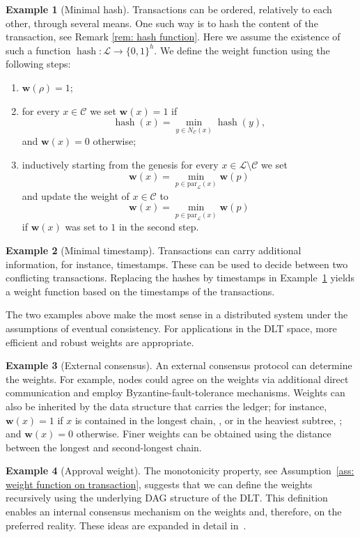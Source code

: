 \documentclass[11pt]{article}
\newcommand{\orig}{\rho}
\newcommand{\AW}{\mathbf{w}}
\newcommand{\C}{\mathcal{C}}
\newcommand{\conflictset}{\mathcal{C}}
\newcommand{\ledger}{\mathcal{L}}
\newcommand{\parent}[2]{\mathrm{par}_{#1}\left(#2\right)}
\newcommand{\hash}{\mathop{\mathrm{hash}}}
\theoremstyle{plain}
\theoremstyle{definition}
\newtheorem{example}{Example}
\numberwithin{definition}{section}
\numberwithin{lemma}{section}
\numberwithin{ass}{section}
\numberwithin{remark}{section}
\numberwithin{example}{section}
\numberwithin{proposition}{section}
\numberwithin{theorem}{section}
\begin{document}
\begin{example}[Minimal hash]\label{ex:min}
Transactions can be ordered, relatively to each other, through several means. One such way is to hash the content of the transaction, see Remark \ref{rem: hash function}. Here we assume the existence of such a function $\hash: \ledger \to \{0,1\}^h$. We define the weight function using the following steps:
\begin{enumerate}[leftmargin=*]
    \item $\AW(\orig)=1$;
    \item for every $x \in \C$ we set $\AW(x)=1$ if 
    \[
    \hash(x)= \min_{ y \in N_{\conflictset}(x)} \hash(y),
    \]
    and $\AW(x)=0$ otherwise;
    \item inductively starting from the genesis for every $x \in \ledger \setminus \C$
     we set 
    \[\AW(x)= \min_{p \in \parent{\ledger}{x}} \AW(p)\] and update  the weight of $x\in  \C$ to 
    \[\AW(x)= \min_{p \in \parent{\ledger}{x}} \AW(p)\] if $\AW(x)$ was set to $1$ in the second step. 
\end{enumerate}
\end{example}
\begin{example}[Minimal timestamp]\label{ex:minTS}
Transactions can carry additional information, for instance, timestamps. These can be used to decide between two conflicting transactions. Replacing the hashes by timestamps in Example~\ref{ex:min} yields a weight function based on the timestamps of the transactions.
\end{example}
The two examples above make the most sense in a distributed system under the assumptions of eventual consistency. For applications in the DLT space, more efficient and robust weights are appropriate.

\begin{example}[External consensus]\label{ex:extConsensus}
An external consensus protocol can determine the weights. For example, nodes could agree on the weights via additional direct communication and employ Byzantine-fault-tolerance mechanisms. Weights can also be inherited by the data structure that carries the ledger; for instance, $\AW(x)=1$ if $x$ is contained in the longest chain, \cite{nakamoto2008bitcoin}, or in the heaviest subtree, \cite{GHOST}; and $\AW(x)=0$ otherwise. Finer weights can be obtained using the distance between the longest and second-longest chain. 
\end{example}


\begin{example}[Approval weight]
The monotonicity property, see  Assumption~\ref{ass: weight function on transaction}, suggests that we can define the weights  recursively using the underlying DAG structure of the  DLT. This definition enables an internal consensus mechanism on the weights and, therefore, on the preferred reality. These ideas are expanded in detail in~\cite{OTV}.
\end{example}
\end{document}
